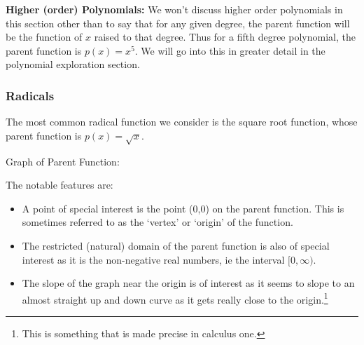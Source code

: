 \documentclass{ximera}
\begin{document}
        \textbf{Higher (order) Polynomials:} We won't discuss higher order polynomials in this section other than to say that for any given degree, the parent function will be the function of $x$ raised to that degree. Thus for a fifth degree polynomial, the parent function is $p(x) = x^5$. We will go into this in greater detail in the polynomial exploration section.


    \subsubsection*{Radicals}
        \begin{description}
            \item[Parent Function:] The most common radical function we consider is the square root function, whose parent function is $p(x) = \sqrt{x}$.\\
            \begin{minipage}{\textwidth}\item[Graph of Parent Function:]\hspace*{0pt} \\
                \begin{center}
                \end{center}
            \end{minipage}
            \item[Notable Features of Graph:] The notable features are:
            \begin{itemize}
                \item A point of special interest is the point (0,0) on the parent function. This is sometimes referred to as the `vertex' or `origin' of the function.
                \item The restricted (natural) domain of the parent function is also of special interest as it is the non-negative real numbers, ie the interval $[0,\infty)$.
                \item The slope of the graph near the origin is of interest as it seems to slope to an almost straight up and down curve as it gets really close to the origin.\footnote{This is something that is made precise in calculus one.}

\end{itemize}
\end{description}
\end{document}

